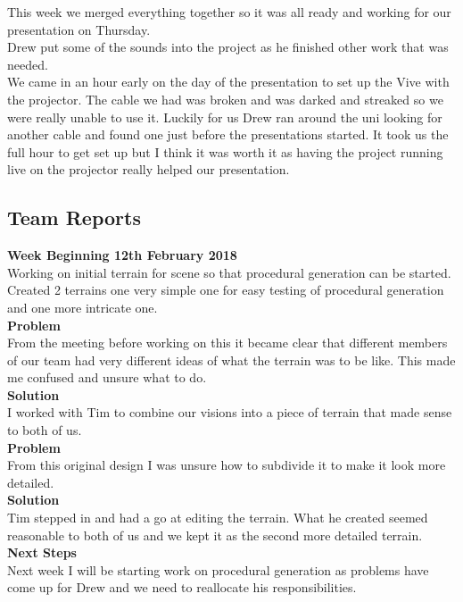 \documentclass[10pt, a4paper]{article}
\begin{document}
    This week we merged everything together so it was all ready and working for our presentation on Thursday.\\
    
    Drew put some of the sounds into the project as he finished other work that was needed.\\
    
    We came in an hour early on the day of the presentation to set up the Vive with the projector. The cable we had was broken and was darked and streaked so we were really unable to use it. Luckily for us Drew ran around the uni looking for another cable and found one just before the presentations started. It took us the full hour to get set up but I think it was worth it as having the project running live on the projector really helped our presentation.\\

	\subsection{Team Reports}
	\textbf{Week Beginning 12th February 2018}\\
	Working on initial terrain for scene so that procedural generation can be started. Created 2 terrains
	one very simple one for easy testing of procedural generation and one more intricate one.\\
	\textbf{Problem}\\
	From the meeting before working on this it became clear that different members of our team had
	very different ideas of what the terrain was to be like. This made me confused and unsure what to
	do.\\
	\textbf{Solution}\\
	I worked with Tim to combine our visions into a piece of terrain that made sense to both of us.\\
	\textbf{Problem}\\
	From this original design I was unsure how to subdivide it to make it look more detailed.\\
	\textbf{Solution}\\
	Tim stepped in and had a go at editing the terrain. What he created seemed reasonable to both of us
	and we kept it as the second more detailed terrain.\\
	\textbf{Next Steps}\\
	Next week I will be starting work on procedural generation as problems have come up for Drew and
	we need to reallocate his responsibilities.\\\\
	
\end{document}
